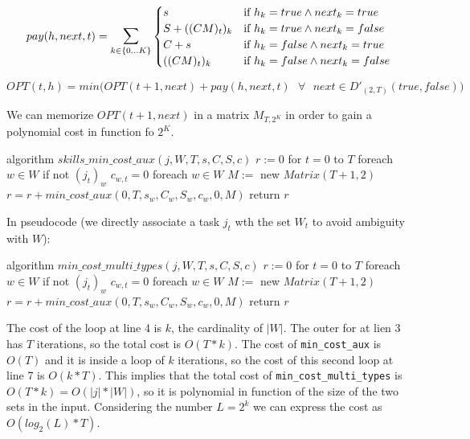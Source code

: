 \documentclass[paper=a4, fontsize=11pt]{scrartcl} %
\numberwithin{equation}{section} %
\numberwithin{figure}{section} %
\numberwithin{table}{section} %
\begin{document}
\[
    pay(h, next, t) = \mathlarger{\sum}_{k \in \{0 ... K\}}
    \begin{cases}
        s & \text{if } h_k = true \land next_k = true \\
        S + ((CM)_t)_k & \text{if } h_k = true \land next_k = false \\
        C + s & \text{if } h_k = false \land next_k = true \\
        ((CM)_t)_k & \text{if } h_k = false \land next_k = false
    \end{cases}
\]

\[
    OPT(t, h) = min\Bigg( OPT(t+1, next) + pay(h, next, t)  \text{ }\forall\text{ } next \in D'_{(2,T)}({true, false})\Bigg)
\]

We can memorize $OPT(t+1, next)$ in a matrix $M_{T,2^K}$ in order to gain a polynomial cost in function fo $2^K$.



\begin{pseudo}
algorithm $skills\_min\_cost\_aux(j, W, T, s, C, S, c)$
    $r := 0$
    for $t = 0$ to $T$
        foreach $w \in W$
            if not $(j_t)_w$
                $c_{w,t} = 0$
    foreach $w \in W$
        $M :=$ new $Matrix(T+1, 2)$
        $r = r + min\_cost\_aux(0, T, s_w, C_w, S_w, c_w, 0, M)$
    return $r$
\end{pseudo}


In pseudocode (we directly associate a task $j_t$ wth the set $W_t$ to avoid ambiguity with $W$):

\begin{pseudo}
algorithm $min\_cost\_multi\_types(j, W, T, s, C, S, c)$
    $r := 0$
    for $t = 0$ to $T$
        foreach $w \in W$
            if not $(j_t)_w$
                $c_{w,t} = 0$
    foreach $w \in W$
        $M :=$ new $Matrix(T+1, 2)$
        $r = r + min\_cost\_aux(0, T, s_w, C_w, S_w, c_w, 0, M)$
    return $r$
\end{pseudo}

The cost of the loop at line 4 is $k$, the cardinality of $|W|$.
The outer for at lien 3 has $T$ iterations, so the total cost is $O(T*k)$.
The cost of \verb|min_cost_aux| is $O(T)$ and it is inside a loop of $k$ iterations, so the cost of this second loop at line 7 is $O(k*T)$.
This implies that the total cost of \verb|min_cost_multi_types| is $O(T*k) = O(|j|*|W|)$, so it is polynomial in function of the size of the two sets in the input.
Considering the number $L = 2^k$ we can express the cost as $O(log_2(L)*T)$.
\end{document}
